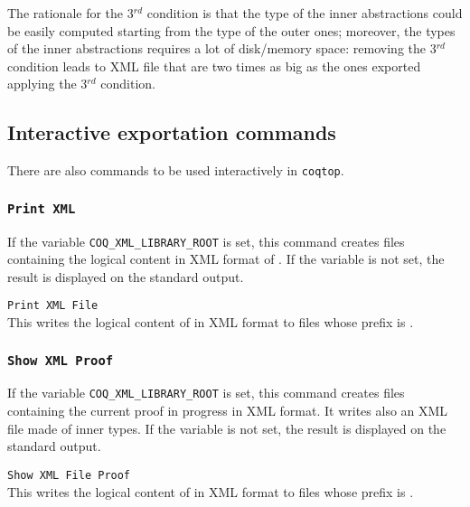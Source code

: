 The rationale for the 3$^{rd}$ condition is that the type of the inner
abstractions could be easily computed starting from the type of the
outer ones; moreover, the types of the inner abstractions requires a
lot of disk/memory space: removing the 3$^{rd}$ condition leads to XML
file that are two times as big as the ones exported applying the 3$^{rd}$
condition.

\subsection{Interactive exportation commands}

There are also commands to be used interactively in {\tt coqtop}.

\subsubsection[\tt Print XML {\qualid}]{\tt Print XML {\qualid}}

If the variable {\tt COQ\_XML\_LIBRARY\_ROOT} is set, this command creates
files containing the logical content in XML format of {\qualid}. If
the variable is not set, the result is displayed on the standard
output.

\begin{Variants}
\item {\tt Print XML File {\str} {\qualid}}\\
This writes the logical content of {\qualid} in XML format to files
whose prefix is {\str}.
\end{Variants}

\subsubsection[{\tt Show XML Proof}]{{\tt Show XML Proof}}

If the variable {\tt COQ\_XML\_LIBRARY\_ROOT} is set, this command creates
files containing the current proof in progress in XML format. It
writes also an XML file made of inner types.  If the variable is not
set, the result is displayed on the standard output.

\begin{Variants}
\item {\tt Show XML File {\str} Proof}\\ This writes the
logical content of {\qualid} in XML format to files whose prefix is
{\str}. 
\end{Variants}

